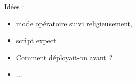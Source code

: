 	
Idées : 

\begin{itemize}
	\item mode opératoire suivi religieusement, 
	\item script expect
	\item Comment déployait-on avant ?
	\item ...
\end{itemize}
